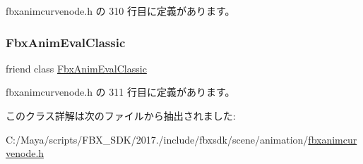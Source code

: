  fbxanimcurvenode.\+h の 310 行目に定義があります。

\mbox{\label{class_fbx_anim_curve_node_a1b769b6684b71dfe76f350fef1137cab}} 
\subsubsection{\texorpdfstring{Fbx\+Anim\+Eval\+Classic}{FbxAnimEvalClassic}}
{\footnotesize\ttfamily friend class \hyperlink{class_fbx_anim_eval_classic}{Fbx\+Anim\+Eval\+Classic}\hspace{0.3cm}{\ttfamily [friend]}}



 fbxanimcurvenode.\+h の 311 行目に定義があります。



このクラス詳解は次のファイルから抽出されました\+:\begin{DoxyCompactItemize}
\item 
C\+:/\+Maya/scripts/\+F\+B\+X\+\_\+\+S\+D\+K/2017./include/fbxsdk/scene/animation/\hyperlink{fbxanimcurvenode_8h}{fbxanimcurvenode.\+h}\end{DoxyCompactItemize}
